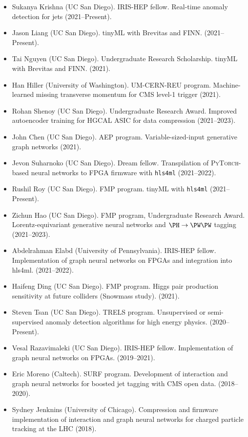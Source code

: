 \documentclass[11pt]{res}
\begin{document}
\begin{resume}
\begin{itemize}
    \item Sukanya Krishna (UC San Diego). IRIS-HEP fellow. Real-time anomaly detection for jets ({2021--Present}).
    \item Jason Liang (UC San Diego). tinyML with Brevitas and FINN. ({2021--Present}).
    \item Tai Nguyen (UC San Diego). Undergraduate Research Scholarship. tinyML with Brevitas and FINN. ({2021}).
    \item Han Hiller (University of Washington). UM-CERN-REU program. Machine-learned missing transverse momentum for CMS level-1 trigger ({2021}).
    \item Rohan Shenoy (UC San Diego). Undergraduate Research Award. Improved autoencoder training for HGCAL ASIC for data compression ({2021--2023}).
    \item John Chen (UC San Diego). AEP program. Variable-sized-input generative graph networks ({2021}).
    \item Jevon Suharnoko (UC San Diego). Dream fellow. Transpilation of \textsc{PyTorch}-based neural networks to FPGA firmware with \texttt{hls4ml} ({2021--2022}).
    \item Rushil Roy (UC San Diego). FMP program. tinyML with \texttt{hls4ml} ({2021--Present}).
    \item Zichun Hao (UC San Diego). FMP program, Undergraduate Research Award. Lorentz-equivariant generative neural networks and $\PH\to\PW\PW$ tagging ({2021--2023}).
    \item Abdelrahman Elabd (University of Pennsylvania). IRIS-HEP fellow. Implementation of graph neural networks on FPGAs and integration into hls4ml. ({2021--2022}).
    \item Haifeng Ding (UC San Diego). FMP program. Higgs pair production sensitivity at future colliders (Snowmass study). ({2021}).
    \item Steven Tsan (UC San Diego). TRELS program. Unsupervised or semi-supervised anomaly detection algorithms for high energy physics. ({2020--Present}).
    \item Vesal Razavimaleki (UC San Diego). IRIS-HEP fellow. Implementation of graph neural networks on FPGAs. ({2019--2021}).
    \item Eric Moreno (Caltech). SURF program. Development of interaction and graph neural networks for boosted jet tagging with CMS open data. ({2018--2020}).
    \item Sydney Jenknins (University of Chicago). Compression and firmware implementation of interaction and graph neural networks for charged particle tracking at the LHC ({2018}).

\end{itemize}
\end{resume}
\end{document}

